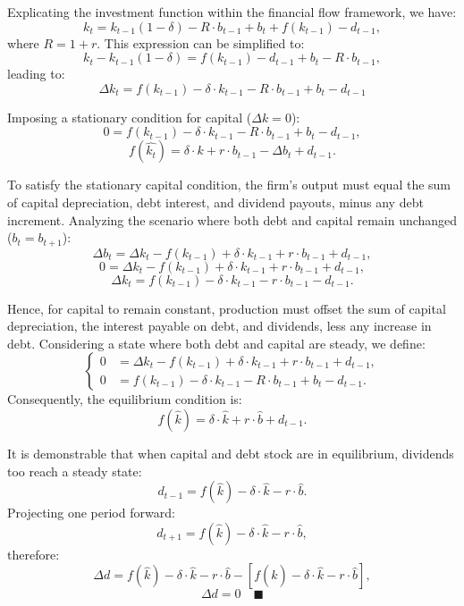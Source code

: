 \documentclass[12pt]{article}
\begin{document}
Explicating the investment function within the financial flow framework, we have:
\[k_t = k_{t-1}(1 - \delta) - R \cdot b_{t-1} + b_{t} + f(k_{t-1}) - d_{t-1},\]
where \(R = 1 + r\).
This expression can be simplified to:
\[k_t - k_{t-1}(1 - \delta) = f(k_{t-1}) - d_{t-1} + b_{t} - R \cdot b_{t-1},\]
leading to:
\[\Delta k_t = f(k_{t-1}) - \delta \cdot k_{t-1} - R \cdot b_{t-1} + b_{t} - d_{t-1}\]

Imposing a stationary condition for capital (\(\Delta k = 0\)):
\[0 = f(k_{t-1}) - \delta \cdot k_{t-1} - R \cdot b_{t-1} + b_{t} - d_{t-1},\]
\[f(\widehat{k_t}) = \delta \cdot k + r \cdot b_{t-1} - \Delta b_{t} + d_{t-1}.\]

To satisfy the stationary capital condition, the firm's output must equal the sum of capital depreciation, debt
interest, and dividend payouts, minus any debt increment. Analyzing the scenario where both debt and capital remain
unchanged (\(b_t = b_{t+1}\)): 
\[\Delta b_t = \Delta k_t - f(k_{t-1}) + \delta \cdot k_{t-1} + r \cdot b_{t-1} + d_{t-1},\]
\[0 = \Delta k_t - f(k_{t-1}) + \delta \cdot k_{t-1} + r \cdot b_{t-1} + d_{t-1},\]
\[\Delta k_t = f(k_{t-1}) - \delta \cdot k_{t-1} - r \cdot b_{t-1} - d_{t-1}.\]

Hence, for capital to remain constant, production must offset the sum of capital depreciation, the interest payable on
debt, and dividends, less any increase in debt. Considering a state where both debt and capital are steady, we define: 
\begin{equation}
    \left\{
        \begin{aligned}
            0 &= \Delta k_t - f(k_{t-1}) + \delta \cdot k_{t-1} + r \cdot b_{t-1} + d_{t-1},    \\
            0 &= f(k_{t-1}) - \delta \cdot k_{t-1} - R \cdot b_{t-1} + b_{t} - d_{t-1}.
        \end{aligned}
    \right.
\end{equation}
Consequently, the equilibrium condition is:
\[f(\widehat{k}) = \delta \cdot \widehat{k} + r \cdot \widehat{b} + d_{t-1}.\]

It is demonstrable that when capital and debt stock are in equilibrium, dividends too reach a steady state:
\[d_{t-1} = f(\widehat{k}) - \delta \cdot \widehat{k} - r \cdot \widehat{b}.\]
Projecting one period forward:
\[d_{t+1} = f(\widehat{k}) - \delta \cdot \widehat{k} - r \cdot \widehat{b},\]
therefore:
\[\Delta d = f(\widehat
{k}) - \delta \cdot \widehat{k} - r \cdot \widehat{b} - \left[f(\widehat{k}) - \delta \cdot \widehat{k} - r \cdot
\widehat{b}\right], \]
\[\Delta d = 0 \quad \blacksquare \]
\end{document}
